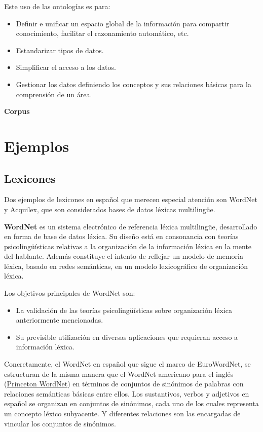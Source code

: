 \documentclass[11pt]{exam}
\begin{document}
\begin{questions}
Este uso de las ontologías es para:

\begin{itemize}
	\item Definir e unificar un espacio global de la información para compartir conocimiento, facilitar el razonamiento automático, etc.
	\item Estandarizar tipos de datos.
	\item Simplificar el acceso a los datos.
	\item Gestionar los datos definiendo los conceptos y sus relaciones básicas para la comprensión de un área.
\end{itemize}

{\bf Corpus}

\section*{Ejemplos}

\subsection*{Lexicones}

Dos ejemplos de lexicones en español que merecen especial atención son WordNet y Acquilex, que son considerados bases de datos léxicas multilingüe. 

{\bf WordNet} es un sistema electrónico de referencia léxica multilingüe, desarrollado en forma de base de datos léxica. Su diseño está en consonancia con teorías psicolingüísticas relativas a la organización de la información léxica en la mente del hablante. Además constituye el intento de reflejar un modelo de memoria léxica, basado en redes semánticas, en un modelo lexicográfico de organización léxica. 

Los objetivos principales de WordNet son: 

\begin{itemize}
	\item La validación de las teorías psicolingüísticas sobre organización léxica anteriormente mencionadas.
	\item Su previsible utilización en diversas aplicaciones que requieran acceso a información léxica.
\end{itemize}

Concretamente, el WordNet en español que sigue el marco de EuroWordNet, se estructuran de la misma manera que el WordNet americano para el inglés (\href{https://wordnet.princeton.edu/}{Princeton WordNet}) en términos de conjuntos de sinónimos de palabras con relaciones semánticas básicas entre ellos. Los sustantivos, verbos y adjetivos en español se organizan en conjuntos de sinónimos, cada uno de los cuales representa un concepto léxico subyacente. Y diferentes relaciones son las encargadas de vincular los conjuntos de sinónimos. 


\end{questions}
\end{document}
